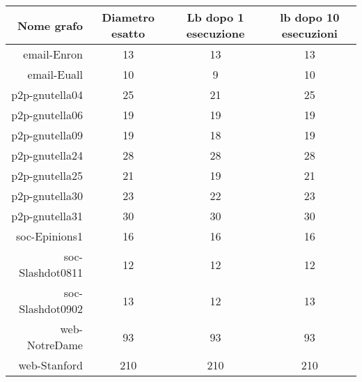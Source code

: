 \documentclass[twoside,openright,titlepage,fleqn,
	headinclude,11pt,a4paper,BCOR5mm,footinclude,pdftex
	]{scrbook}
\begin{document}
\begin{center}
\begin{tabular}{|r|c|c|c|}
\hline
Nome grafo&Diametro esatto&Lb dopo 1 esecuzione&lb  dopo 10 esecuzioni\\ \hline
email-Enron&13&13&13\\ \hline
email-Euall&10&9&10\\ \hline
p2p-gnutella04&25&21&25\\ \hline
p2p-gnutella06&19&19&19\\ \hline
p2p-gnutella09&19&18&19\\ \hline
p2p-gnutella24&28&28&28\\ \hline
p2p-gnutella25&21&19&21\\ \hline
p2p-gnutella30&23&22&23\\ \hline
p2p-gnutella31&30&30&30\\ \hline
soc-Epinions1&16&16&16\\ \hline
soc-Slashdot0811&12&12&12\\ \hline
soc-Slashdot0902&13&12&13\\ \hline
web-NotreDame&93&93&93\\ \hline
web-Stanford&210&210&210\\ \hline
\end{tabular}
\end{center}





















\end{document}
